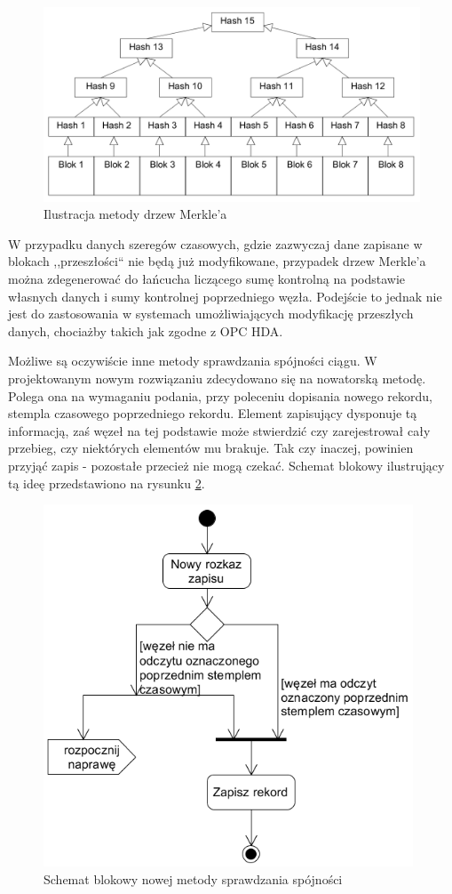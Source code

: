 \documentclass[a4paper,polish,12pt,twoside]{article}
\begin{document}
	\begin{figure}[h]
		\centering \includegraphics[width=15cm]{merkle}
		\caption{Ilustracja metody drzew Merkle'a}
		\label{fig:merkle}
	\end{figure}

W przypadku danych szeregów czasowych, gdzie zazwyczaj dane zapisane w blokach ,,przeszłości`` nie będą już modyfikowane, przypadek drzew Merkle'a można zdegenerować do łańcucha liczącego sumę kontrolną na podstawie własnych danych i sumy kontrolnej poprzedniego węzła. Podejście to jednak nie jest do zastosowania w systemach umożliwiających modyfikację przeszłych danych, chociażby takich jak zgodne z OPC HDA.

Możliwe są oczywiście inne metody sprawdzania spójności ciągu. W projektowanym nowym rozwiązaniu zdecydowano się na nowatorską metodę. Polega ona na wymaganiu podania, przy poleceniu dopisania nowego rekordu, stempla czasowego poprzedniego rekordu. Element zapisujący dysponuje tą informacją, zaś węzeł na tej podstawie może stwierdzić czy zarejestrował cały przebieg, czy niektórych elementów mu brakuje. Tak czy inaczej, powinien przyjąć zapis - pozostałe przecież nie mogą czekać. Schemat blokowy ilustrujący tą ideę przedstawiono na rysunku \ref{fig:novel_decider}.

	\begin{figure}[h]
		\centering \includegraphics[width=11cm]{novel_decider}
		\caption{Schemat blokowy nowej metody sprawdzania spójności}
		\label{fig:novel_decider}
	\end{figure}
\end{document}
